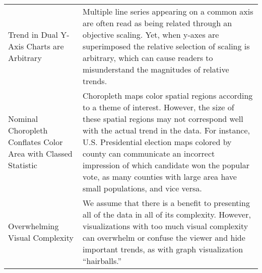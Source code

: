 \begin{longtable}{>{\raggedright\arraybackslash}p{3cm}p{14cm}}
 \rowcolor{colorc}Trend in Dual Y-Axis Charts are Arbitrary  & Multiple line series appearing on a common axis are often read as being related through an objective scaling. Yet, when y-axes are superimposed the relative selection of scaling is arbitrary, which can cause readers to misunderstand the magnitudes of relative trends. \cite{KindlmannAlgebraicVisPedagogyPDV2016, cairo2015graphics}\\
 \rowcolor{colorc-opaque}Nominal Choropleth Conflates Color Area with Classed Statistic  & Choropleth maps color spatial regions according to a theme of interest. However, the size of these spatial regions may not correspond well with the actual trend in the data. For instance, U.S. Presidential election maps colored by county can communicate an incorrect impression of which candidate won the popular vote, as many counties with large area have small populations, and vice versa. \cite{gastner2005maps,nusrat2016state}\\
 \rowcolor{colorc}Overwhelming Visual Complexity  & We assume that there is a benefit to presenting all of the data in all of its complexity. However, visualizations with too much visual complexity can overwhelm or confuse the viewer and hide important trends, as with graph visualization ``hairballs.'' \cite{hofmann2012graphical, greadability}\\
  


\end{longtable}

